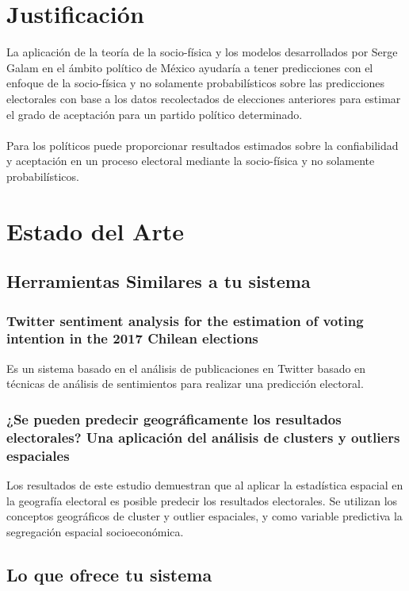 \section{Justificación}
La aplicación de la teoría de la socio-física y los modelos desarrollados por Serge Galam en el ámbito político de México ayudaría a tener predicciones con el enfoque de la socio-física y no solamente probabilísticos sobre las predicciones electorales con base a los datos recolectados de elecciones anteriores para estimar el grado de aceptación para un partido político determinado.
\\
\\
Para los políticos puede proporcionar resultados estimados sobre la confiabilidad y aceptación en un proceso electoral mediante la socio-física y no solamente probabilísticos.

\section{Estado del Arte}
\subsection{Herramientas Similares a tu sistema}
\subsubsection{Twitter sentiment analysis for the estimation of voting intention in the 2017 Chilean elections}
Es un sistema basado en el análisis de publicaciones en Twitter basado en técnicas de análisis de sentimientos para realizar una predicción electoral.\cite{TomasAlegreSepulveda2020}

\subsubsection{¿Se pueden predecir geográficamente los resultados electorales? Una aplicación del análisis de clusters y outliers espaciales}
Los resultados de este estudio demuestran que al aplicar la estadística espacial en la geografía electoral es posible predecir los resultados electorales. Se utilizan los conceptos geográficos de cluster y outlier espaciales, y como variable predictiva la segregación espacial socioeconómica.\cite{Perdomo2008}
		
\subsection{Lo que ofrece tu sistema}
